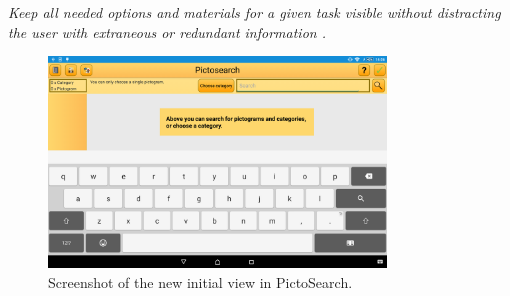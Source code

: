\begin{displayquote}
\textit{Keep all needed options and materials for a given task visible without distracting the user with extraneous or redundant information \cite[p.~55]{DESIGNBOOK}.}
\end{displayquote}

\begin{figure}[h]
    \centering
    \includegraphics[width=0.8\textwidth]{figures/img/screenshots/new_startup.png}
    \caption{Screenshot of the new initial view in PictoSearch.}\label{fig:screenshot_newstartup}
\end{figure}

